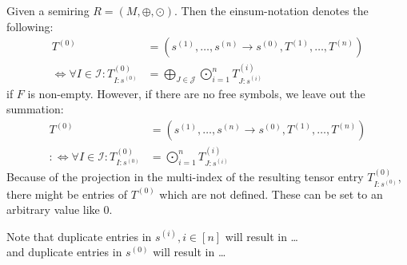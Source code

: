 Given a semiring $R = (M, \oplus, \odot)$. Then the einsum-notation denotes the following:
\begin{align*}
    T^{(0)}                                              & = (s^{(1)},\dots,s^{(n)} \rightarrow s^{(0)}, T^{(1)},\dots,T^{(n)})                   \\
    \iff \forall I \in \mathcal{I}: T^{(0)}_{I: s^{(0)}} & = \bigoplus\limits_{J \in \mathcal{J}} \bigodot\limits_{i = 1}^{n} T^{(i)}_{J:s^{(i)}}
\end{align*}
if $F$ is non-empty. However, if there are no free symbols, we leave out the summation:
\begin{align*}
    T^{(0)}                                               & = (s^{(1)},\dots,s^{(n)} \rightarrow s^{(0)}, T^{(1)},\dots,T^{(n)}) \\
    :\iff \forall I \in \mathcal{I}: T^{(0)}_{I: s^{(0)}} & = \bigodot\limits_{i = 1}^{n} T^{(i)}_{J:s^{(i)}}
\end{align*}
Because of the projection in the multi-index of the resulting tensor entry $T^{(0)}_{I: s^{(0)}}$, there might be entries of $T^{(0)}$ which are not defined.
These can be set to an arbitrary value like 0.

Note that duplicate entries in $s^{(i)}, i \in [n]$ will result in \dots\\
and duplicate entries in $s^{(0)}$ will result in \dots